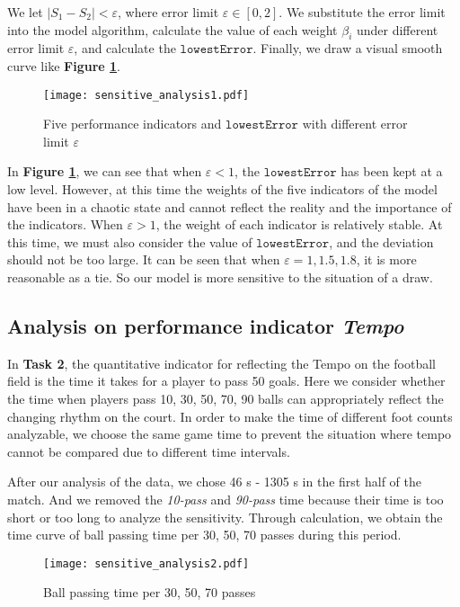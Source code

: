 \documentclass[12pt]{article}  %
\begin{document}
We let ${\left| S_1-S_2 \right| < \varepsilon}$, where error limit $\varepsilon \in [0,2]$. We substitute the error limit into the model algorithm, calculate the value of each weight $\beta_i$ under different error limit $\varepsilon$, and calculate the $\mathtt{lowestError}$. Finally, we draw a visual smooth curve like \textbf{Figure \ref{fig:sensitive_analysis1}}.
\begin{figure}[htbp]
    \centering
    \texttt{[image: sensitive\_analysis1.pdf]} 	%
    \caption{Five performance indicators and $\mathtt{lowestError}$ with different error limit $\varepsilon$}		%
    \label{fig:sensitive_analysis1}							%
\end{figure}

In \textbf{Figure \ref{fig:sensitive_analysis1}}, we can see that when $\varepsilon <1$, the $\mathtt{lowestError}$ has been kept at a low level. However, at this time the weights of the five indicators of the model have been in a chaotic state and cannot reflect the reality and the importance of the indicators. 
When $\varepsilon> 1$, the weight of each indicator is relatively stable. At this time, we must also consider the value of $\mathtt{lowestError}$, and the deviation should not be too large. It can be seen that when $\varepsilon = 1, 1.5, 1.8$, it is more reasonable as a tie. So our model is more sensitive to the situation of a draw.

\subsection{Analysis on performance indicator \textit{Tempo}}
In \textbf{Task 2}, the quantitative indicator for reflecting the {Tempo} on the football field is the time it takes for a player to pass 50 goals. Here we consider whether the time when players pass 10, 30, 50, 70, 90 balls can appropriately reflect the changing rhythm on the court. In order to make the time of different foot counts analyzable, we choose the same game time to prevent the situation where tempo cannot be compared due to different time intervals.

After our analysis of the data, we chose 46 s - 1305 s in the first half of the match. And we removed the \textit{10-pass} and \textit{90-pass} time because their time is too short or too long to analyze the sensitivity.  Through calculation, we obtain the time curve of  ball passing time per 30, 50, 70 passes during this period.
\begin{figure}[htbp]
    \centering
    \texttt{[image: sensitive\_analysis2.pdf]} 	%
    \caption{Ball passing time per 30, 50, 70 passes}		%
    \label{fig:sensitive_analysis2}							%
\end{figure}
\end{document}
